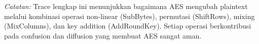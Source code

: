\noindent\textit{Catatan:}
Trace lengkap ini menunjukkan bagaimana AES mengubah plaintext melalui kombinasi
operasi non-linear (SubBytes), permutasi (ShiftRows), mixing (MixColumns), dan
key addition (AddRoundKey). Setiap operasi berkontribusi pada confusion dan
diffusion yang membuat AES sangat aman.

